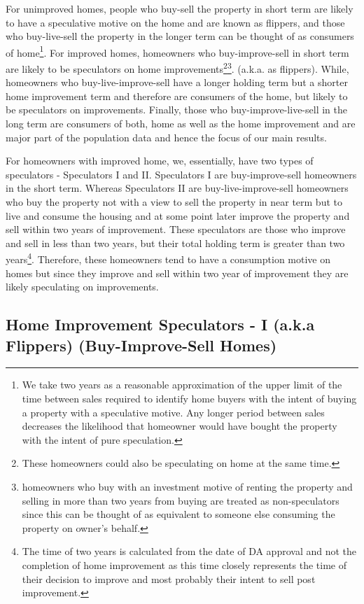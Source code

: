 \documentclass[AEJ,reqno, draftmode]{AEA} %
\begin{document}
For unimproved homes, people who buy-sell the property in short term are likely to have a speculative motive on the home and are known as flippers, and those who buy-live-sell the property in the longer term can be thought of as consumers of home\footnote{We take two years as a reasonable approximation of the upper limit of the time between sales required to identify home buyers with the intent of buying a property with a speculative motive. Any longer period between sales decreases the likelihood that homeowner would have bought the property with the intent of pure speculation.}. For improved homes, homeowners who buy-improve-sell in short term are likely to be speculators on home improvements\footnote{These homeowners could also be speculating on home at the same time.}\footnote{homeowners who buy with an investment motive of renting the property and selling in more than two years from buying are treated as non-speculators since this can be thought of as equivalent to someone else consuming the property on owner's behalf.}. (a.k.a. as flippers). While, homeowners who buy-live-improve-sell have a longer holding term but a shorter home improvement term and therefore are consumers of the home, but likely to be speculators on improvements. Finally, those who buy-improve-live-sell in the long term are consumers of both, home as well as the home improvement and are major part of the population data and hence the focus of our main results.

For homeowners with improved home, we, essentially, have two types of speculators - Speculators I and II. Speculators I are buy-improve-sell homeowners in the short term. Whereas Speculators II are buy-live-improve-sell homeowners who buy the property not with a view to sell the property in near term but to live and consume the housing and at some point later improve the property and sell within two years of improvement. These speculators are those who improve and sell in less than two years, but their total holding term is greater than two years\footnote{The time of two years is calculated from the date of DA approval and not the completion of home improvement as this time closely represents the time of their decision to improve and most probably their intent to sell post improvement.}. Therefore, these homeowners tend to have a consumption motive on homes but since they improve and sell within two year of improvement they are likely speculating on improvements.


\subsection{Home Improvement Speculators - I (a.k.a Flippers) (Buy-Improve-Sell Homes)}
\end{document}
